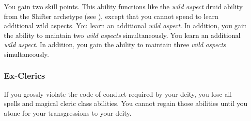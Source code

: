              You gain two skill points.
             This ability functions like the \textit{wild aspect} druid ability from the Shifter archetype (see ), except that you cannot spend  to learn additional wild aspects.
             You learn an additional \textit{wild aspect}.
            In addition, you gain the ability to maintain two \textit{wild aspects} simultaneously.
             You learn an additional \textit{wild aspect}.
            In addition, you gain the ability to maintain three \textit{wild aspects} simultaneously.

        \subsubsection{Ex-Clerics}
            If you grossly violate the code of conduct required by your deity, you lose all spells and magical cleric class abilities.
            You cannot regain those abilities until you atone for your transgressions to your deity.

\newpage
